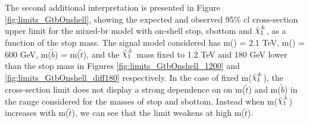 The second additional interpretation is presented in 
Figure \ref{fig:limits_GtbOnshell}, showing the expected and observed 95\% \gls{cl} cross-section upper limit for the mixed-\gls{br}
 model with on-shell stop, sbottom and $\chinoonepm$, as a function of the stop mass.
The signal model considered has m(\gluino) = 2.1 TeV, m(\ninoone) = 600 GeV, m($\tilde{b}$) = m($\tilde{t}$), 
and the $\chinoonepm$ mass fixed to 1.2 TeV and 
180 GeV lower than the stop mass in Figures \ref{fig:limits_GtbOnshell_1200}  and \ref{fig:limits_GtbOnshell_diff180} respectively.
In the case of fixed m($\chinoonepm$), the cross-section limit does not display a strong dependence on 
on m($\tilde{t}$) and m($\tilde{b}$) 
in the range considered for the masses of stop and sbottom. 
Instead when m($\chinoonepm$) increases with m($\tilde{t}$),
we can see that the limit weakens at high m($\tilde{t}$).

